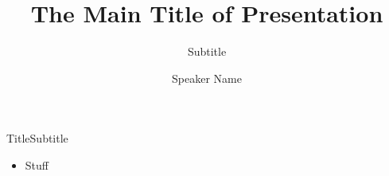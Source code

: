 \documentclass{beamer}%
\title{The Main Title of Presentation}
\subtitle{Subtitle}
\author{Speaker Name}
\institute{SciLifeLab Data Centre}
\date{}
\begin{document}
 \begin{frame}
  \maketitle
 \end{frame}
 
\begin{frame}{Title}{Subtitle}
 \begin{itemize}
  \item Stuff
 \end{itemize}
\end{frame}


 
\end{document}
